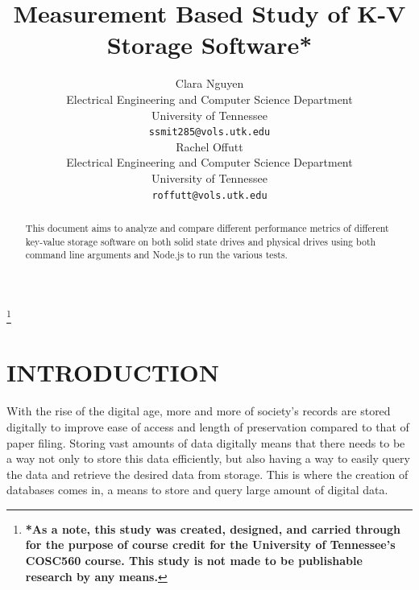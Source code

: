 \documentclass[letterpaper, 10 pt, conference]{ieeeconf}
\begin{document}
\title{\LARGE \bf
Measurement Based Study of K-V Storage Software*
}

\author{ \parbox{3 in}{\centering Clara Nguyen
        \\
        Electrical Engineering and Computer Science Department\\
         University of Tennessee\\
         {\tt\small ssmit285@vols.utk.edu}}
         \hspace*{ 0.5 in}
         \parbox{3 in}{ \centering Rachel Offutt
        \\
       Electrical Engineering and Computer Science Department\\
         University of Tennessee\\
         {\tt\small roffutt@vols.utk.edu}}
}
\thanks {\textbf{*As a note, this study was created, designed, and carried through for the purpose of course credit for the University of Tennessee's COSC560 course. This study is not made to be publishable research by any means.}}







\maketitle
\thispagestyle{empty}
\pagestyle{empty}


\begin{abstract}

This document aims to analyze and compare different performance metrics of different key-value storage software on both solid state drives and physical drives using both command line arguments and Node.js to run the various tests.

\end{abstract}

\section{INTRODUCTION}

With the rise of the digital age, more and more of society's records are stored digitally to improve ease of access and length of preservation compared to that of paper filing. Storing vast amounts of data digitally means that there needs to be a way not only to store this data efficiently, but also having a way to easily query the data and retrieve the desired data from storage. This is where the creation of databases comes in, a means to store and query large amount of digital data.
\end{document}
